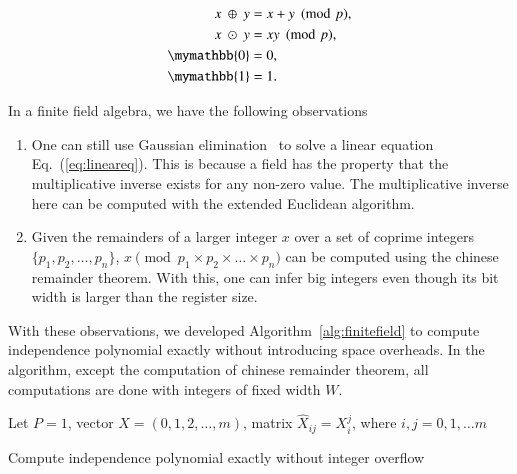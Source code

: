 \documentclass[review,onefignum,onetabnum]{siamart190516}
\newcommand{\<}{\langle}
\renewcommand{\>}{\rangle}
\newcommand{\Eq}[1]{Eq.~(\ref{#1})}
\begin{document}
\begin{align}
\begin{split}
    x ~\oplus~ y &= x+y\pmod p,\\
    x ~\odot~ y &= xy\pmod p,\\
    \mymathbb{0} &= 0,\\
    \mymathbb{1} &= 1.
\end{split}\label{eq:finitefield}
\end{align}

In a finite field algebra, we have the following observations
\begin{enumerate}
    \item One can still use Gaussian elimination~\cite{Golub2013} to solve a linear equation \Eq{eq:lineareq}.
    This is because a field has the property that the multiplicative inverse exists for any non-zero value.
    The multiplicative inverse here can be computed with the extended Euclidean algorithm.
    \item Given the remainders of a larger integer $x$ over a set of coprime integers $\{p_1, p_2, \ldots, p_n\}$,
    $x \pmod {p_1 \times p_2 \times \ldots \times p_n}$ can be computed using the chinese remainder theorem.
    With this, one can infer big integers even though its bit width is larger than the register size.
\end{enumerate}
With these observations, we developed Algorithm~\ref{alg:finitefield} to compute independence polynomial exactly without introducing space overheads.
In the algorithm, except the computation of chinese remainder theorem, all computations are done with integers of fixed width $W$.

\begin{algorithm}[!ht]
    \small
    \SetAlgoNoLine
    \LinesNumbered
    Let $P = 1$, vector $X = (0,1,2,\ldots,m)$, matrix $\hat X_{ij} = X_i^j$, where $i,j = 0, 1, \ldots m$\;

    \caption{Compute independence polynomial exactly without integer overflow}\label{alg:finitefield}
\end{algorithm}
\end{document}
